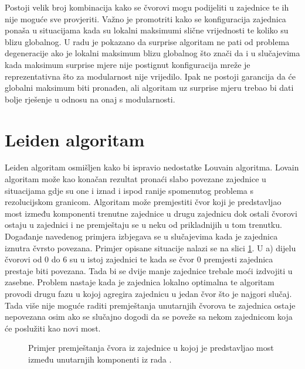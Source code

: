 Postoji velik broj kombinacija kako se čvorovi mogu podijeliti u zajednice te ih nije moguće sve provjeriti. Važno je promotriti kako se konfiguracija zajednica ponaša u situacijama kada su lokalni maksimumi slične vrijednosti te koliko su blizu globalnog. U radu \cite{gamermann2022algorithm} je pokazano da surprise algoritam ne pati od problema degeneracije ako je lokalni maksimum blizu globalnog što znači da i u slučajevima kada maksimum surprise mjere nije postignut konfiguracija mreže je reprezentativna što za modularnost nije vrijedilo. Ipak ne postoji garancija da će globalni maksimum biti pronađen, ali algoritam uz surprise mjeru trebao bi dati bolje rješenje u odnosu na onaj s modularnosti.



\section{Leiden algoritam}

Leiden algoritam osmišljen kako bi ispravio nedostatke Louvain algoritma. Lovain algoritam može kao konačan rezultat pronaći slabo povezane zajednice u situacijama gdje su one i iznad i ispod ranije spomenutog problema s rezolucijskom granicom. Algoritam može premjestiti čvor koji je predstavljao most između komponenti trenutne zajednice u drugu zajednicu dok ostali čvorovi ostaju u zajednici i ne premještaju se u neku od prikladnijih u tom trenutku. Događanje navedenog primjera izbjegava se u slučajevima kada je zajednica iznutra čvrsto povezana. Primjer opisane situacije nalazi se na slici \ref{fig:bridge-node}. U a) dijelu čvorovi od 0 do 6 su u istoj zajednici te kada se čvor 0 premjesti zajednica prestaje biti povezana. Tada bi se dvije manje zajednice trebale moći izdvojiti u zasebne. Problem nastaje kada je zajednica lokalno optimalna te algoritam provodi drugu fazu u kojoj agregira zajednicu u jedan čvor što je najgori slučaj. Tada više nije moguće raditi premještanja unutarnjih čvorova te zajednica ostaje nepovezana osim ako se slučajno dogodi da se poveže sa nekom zajednicom koja će poslužiti kao novi most.

\begin{figure}
	\caption{Primjer premještanja čvora iz zajednice u kojoj je predstavljao most između unutarnjih komponenti iz rada \cite{traag2019louvain}.}
	\label{fig:bridge-node}
\end{figure}


